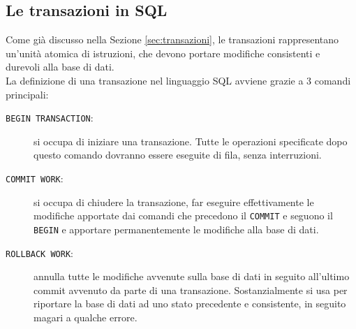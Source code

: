 \documentclass[12pt]{report}
\begin{document}
	\subsection{Le transazioni in SQL}
	Come già discusso nella Sezione \ref{sec:transazioni}, le transazioni rappresentano un'unità atomica di istruzioni, che devono portare modifiche consistenti e durevoli alla base di dati.\\
	La definizione di una transazione nel linguaggio SQL avviene grazie a 3 comandi principali:
	\begin{description}
		\item [\texttt{BEGIN TRANSACTION}:] si occupa di iniziare una transazione. Tutte le operazioni specificate dopo questo comando dovranno essere eseguite di fila, senza interruzioni.
		
		\item[\texttt{COMMIT WORK}:] si occupa di chiudere la transazione, far eseguire effettivamente le modifiche apportate dai comandi che precedono il \texttt{COMMIT} e seguono il \texttt{BEGIN} e apportare permanentemente le modifiche alla base di dati.
		
		\item[\texttt{ROLLBACK WORK}:] annulla tutte le modifiche avvenute sulla base di dati in seguito all'ultimo commit avvenuto da parte di una transazione. Sostanzialmente si usa per riportare la base di dati ad uno stato precedente e consistente, in seguito magari a qualche errore.
	\end{description}
	
\end{document}
